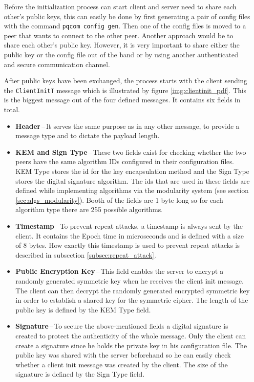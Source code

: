 Before the initialization process can start client and server need to share each other's public keys, this can easily be done by first generating a pair of config files with the command \texttt{pqcom config gen}. Then one of the config files is moved to a peer that wants to connect to the other peer. Another approach would be to share each other's public key. However, it is very important to share either the public key or the config file out of the band or by using another authenticated and secure communication channel.

After public keys have been exchanged, the process starts with the client sending the \texttt{ClientInitT} message which is illustrated by figure \ref{img:clientinit_pdf}. This is the biggest message out of the four defined messages. It contains six fields in total.
\begin{itemize}
  \item \textbf{Header}\,--\,It serves the same purpose as in any other message, to provide a message type and to dictate the payload length.
  \item \textbf{KEM and Sign Type}\,--\,These two fields exist for checking whether the two peers have the same algorithm IDs configured in their configuration files. KEM Type stores the id for the key encapsulation method and the Sign Type stores the digital signature algorithm. The ids that are used in these fields are defined while implementing algorithms via the modularity system (see section \ref{sec:algs_modularity}). Booth of the fields are 1 byte long so for each algorithm type there are 255 possible algorithms.
  \item \textbf{Timestamp}\,--\,To prevent repeat attacks, a timestamp is always sent by the client. It contains the Epoch time in microseconds and is defined with a size of 8 bytes. How exactly this timestamp is used to prevent repeat attacks is described in subsection \ref{subsec:repeat_attack}.
  \item \textbf{Public Encryption Key}\,--\,This field enables the server to encrypt a randomly generated symmetric key when he receives the client init message. The client can then decrypt the randomly generated encrypted symmetric key in order to establish a shared key for the symmetric cipher. The length of the public key is defined by the KEM Type field.
  \item \textbf{Signature}\,--\,To secure the above-mentioned fields a digital signature is created to protect the authenticity of the whole message. Only the client can create a signature since he holds the private key in his configuration file. The public key was shared with the server beforehand so he can easily check whether a client init message was created by the client. The size of the signature is defined by the Sign Type field.
\end{itemize}


